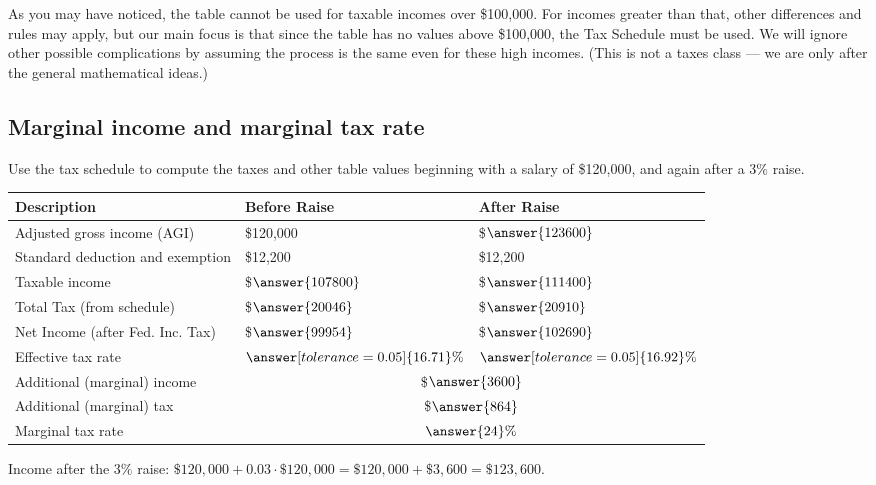 \documentclass[12pt]{ximera}
\begin{document}
As you may have noticed, the table cannot be used for taxable incomes over \$100,000.
For incomes greater than that, other differences and rules may apply, but our main
focus is that since the table has no values above \$100,000, the Tax Schedule must be
used. We will ignore other possible complications by assuming the process is the same
even for these high incomes. (This is not a taxes class --- we are only after the
general mathematical ideas.)

\subsection*{Marginal income and marginal tax rate}

\begin{problem}
Use the tax schedule to compute the taxes and other table values beginning with a
salary of \$120,000, and again after a $3\%$ raise.

\begin{center}
\begin{tabular}{|l|l|l|}
\hline
Description & Before Raise & After Raise \\
\hline
Adjusted gross income (AGI) & \$120,000 & \$$\answer{123600}$ \\
\hline
Standard deduction and exemption & \$12,200 & \$12,200 \\
\hline
Taxable income & \$$\answer{107800}$ & \$$\answer{111400}$ \\
\hline
Total Tax (from schedule) & \$$\answer{20046}$ & \$$\answer{20910}$ \\
\hline
Net Income (after Fed. Inc. Tax) & \$$\answer{99954}$ & \$$\answer{102690}$ \\
\hline
Effective tax rate & $\answer[tolerance=0.05]{16.71}\%$ & $\answer[tolerance=0.05]{16.92}\%$ \\
\hline
Additional (marginal) income & \multicolumn{2}{c|}{\$$\answer{3600}$} \\
\hline
Additional (marginal) tax & \multicolumn{2}{c|}{\$$\answer{864}$} \\
\hline
Marginal tax rate & \multicolumn{2}{c|}{$\answer{24}\%$} \\
\hline
\end{tabular}
\end{center}

\begin{solution}
Income after the $3\%$ raise:
$\$120{,}000 + 0.03 \cdot \$120{,}000 = \$120{,}000 + \$3{,}600 = \$123{,}600$.


\end{solution}
\end{problem}
\end{document}
